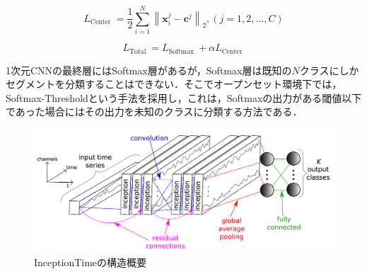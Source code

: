 \begin{equation}{L_{{\text{Center }}}} = \frac{1}{2}\sum\limits_{i = 1}^N {{{\left\| {{\mathbf{x}}_i^j - {{\mathbf{c}}^j}} \right\|}_2}} ,(j = 1,2, \ldots ,C)\tag{2}\end{equation}

\begin{equation}{L_{{\text{Total }}}} = {L_{{\text{Softmax }}}} + \alpha {L_{{\text{Center }}}}\end{equation}

1次元CNNの最終層にはSoftmax層があるが，Softmax層は既知の$N$クラスにしかセグメントを分類することはできない．そこでオープンセット環境下では，Softmax-Thresholdという手法を採用し，これは，Softmaxの出力がある閾値以下であった場合にはその出力を未知のクラスに分類する方法である．


\begin{figure}[H]
\begin{center}
\includegraphics[width=\linewidth]{./fig/InceptionTime.png}
\end{center}
\caption{InceptionTimeの構造概要}
\label{fig:InceptionTime}
\end{figure}

